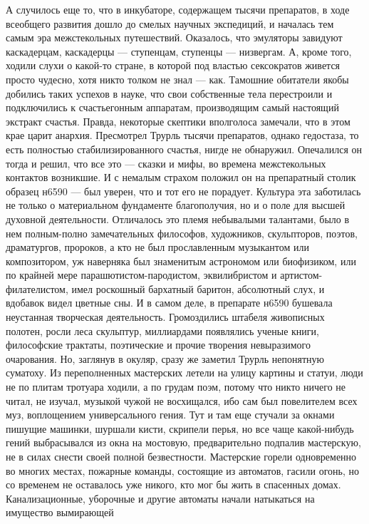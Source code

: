 А случилось еще то, что в инкубаторе, содержащем тысячи
препаратов, в ходе всеобщего развития дошло до смелых
научных экспедиций, и началась тем самым эра межстекольных
путешествий. Оказалось, что эмуляторы завидуют каскадерцам,
каскадерцы --- ступенцам, ступенцы --- низвергам. А, кроме того,
ходили слухи о какой-то стране, в которой под властью
сексократов живется просто чудесно, хотя никто толком не
знал --- как. Тамошние обитатели якобы добились таких успехов
в науке, что свои собственные тела перестроили и
подключились к счастьегонным аппаратам, производящим самый
настоящий экстракт счастья. Правда, некоторые скептики
вполголоса замечали, что в этом крае царит анархия.
Пресмотрел Трурль тысячи препаратов, однако гедостаза, то
есть полностью стабилизированного счастья, нигде не
обнаружил. Опечалился он тогда и решил, что все это --- сказки
и мифы, во времена межстекольных контактов возникшие. И с
немалым страхом положил он на препаратный столик образец
н6590 --- был уверен, что и тот его не порадует. Культура эта
заботилась не только о материальном фундаменте благополучия,
но и о поле для высшей духовной деятельности. Отличалось это
племя небывалыми талантами, было в нем полным-полно
замечательных философов, художников, скульпторов, поэтов,
драматургов, пророков, а кто не был прославленным музыкантом
или композитором, уж наверняка был знаменитым астрономом или
биофизиком, или по крайней мере парашютистом-пародистом,
эквилибристом и артистом-филателистом, имел роскошный
бархатный баритон, абсолютный слух, и вдобавок видел цветные
сны. И в самом деле, в препарате н6590 бушевала неустанная
творческая деятельность. Громоздились штабеля живописных
полотен, росли леса скульптур, миллиардами появлялись ученые
книги, философские трактаты, поэтические и прочие творения
невыразимого очарования. Но, заглянув в окуляр, сразу же
заметил Трурль непонятную суматоху. Из переполненных
мастерских летели на улицу картины и статуи, люди не по
плитам тротуара ходили, а по грудам поэм, потому что никто
ничего не читал, не изучал, музыкой чужой не восхищался, ибо
сам был повелителем всех муз, воплощением универсального
гения. Тут и там еще стучали за окнами пишущие машинки,
шуршали кисти, скрипели перья, но все чаще какой-нибудь
гений выбрасывался из окна на мостовую, предварительно
подпалив мастерскую, не в силах снести своей полной
безвестности. Мастерские горели одновременно во многих
местах, пожарные команды, состоящие из автоматов, гасили
огонь, но со временем не оставалось уже никого, кто мог бы
жить в спасенных домах. Канализационные, уборочные и другие
автоматы начали натыкаться на имущество вымирающей
